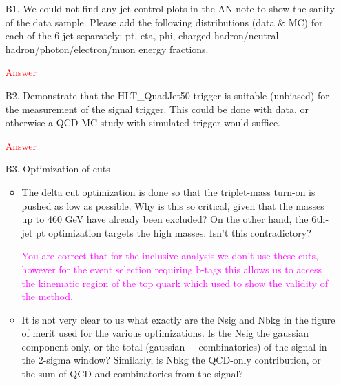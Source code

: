 \documentclass[paper=a4, fontsize=11pt]{scrartcl}
\begin{document}
\begin{itemize}

\item[B1.]  We could not find any jet control plots in the AN note to show the sanity of the data sample. Please add the following distributions (data \& MC) for each of the 6 jet separately: pt, eta, phi, charged hadron/neutral hadron/photon/electron/muon energy fractions.

\textcolor{red}{Answer}\\

\item[B2.] Demonstrate that the HLT\_QuadJet50 trigger is suitable (unbiased) for the measurement of the signal trigger. This could be done with data, or otherwise a QCD MC study with simulated trigger would suffice.

\textcolor{red}{Answer}\\


\item[B3.] Optimization of cuts
\begin{itemize}

\item The delta cut optimization is done so that the triplet-mass turn-on is pushed as low as possible. Why is this so critical, given that the masses up to 460 GeV have already been excluded? On the other hand, the 6th-jet pt optimization targets the high masses. Isn't this contradictory?

\textcolor{magenta}{You are correct that for the inclusive analysis we don't use these cuts, however for the event selection requiring b-tags this
allows us to access the kinematic region of the top quark which used to show the validity of the method.}\\

\item It is not very clear to us what exactly are the Nsig and Nbkg in the figure of merit used for the various optimizations. Is the Nsig the gaussian component only, or the total (gaussian + combinatorics) of the signal in the 2-sigma window? Similarly, is Nbkg the QCD-only contribution, or the sum of QCD and combinatorics from the signal?


\end{itemize}
\end{itemize}
\end{document}
